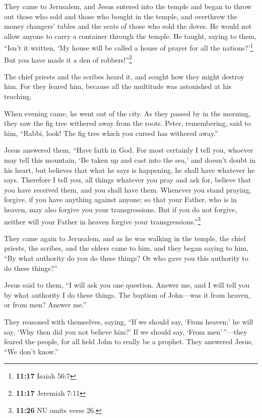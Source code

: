  They came to Jerusalem, and Jesus entered into the
temple and began to throw out those who sold and those who bought in the
temple, and overthrew the money changers' tables and the seats of those
who sold the doves.  He would not allow anyone to carry a
container through the temple.  He taught, saying to them,
``Isn't it written, `My house will be called a house of prayer for all
the nations?'\footnote{\textbf{11:17} Isaiah 56:7} But you have made it
a den of robbers!''\footnote{\textbf{11:17} Jeremiah 7:11}

 The chief priests and the scribes heard it, and sought
how they might destroy him. For they feared him, because all the
multitude was astonished at his teaching.

 When evening came, he went out of the city.
 As they passed by in the morning, they saw the fig tree
withered away from the roots.  Peter, remembering, said
to him, ``Rabbi, look! The fig tree which you cursed has withered
away.''

 Jesus answered them, ``Have faith in God.
 For most certainly I tell you, whoever may tell this
mountain, `Be taken up and cast into the sea,' and doesn't doubt in his
heart, but believes that what he says is happening, he shall have
whatever he says.  Therefore I tell you, all things
whatever you pray and ask for, believe that you have received them, and
you shall have them.  Whenever you stand praying,
forgive, if you have anything against anyone; so that your Father, who
is in heaven, may also forgive you your transgressions. 
But if you do not forgive, neither will your Father in heaven forgive
your transgressions.''\footnote{\textbf{11:26} NU omits verse 26.}

 They came again to Jerusalem, and as he was walking in
the temple, the chief priests, the scribes, and the elders came to him,
 and they began saying to him, ``By what authority do you
do these things? Or who gave you this authority to do these things?''

 Jesus said to them, ``I will ask you one question.
Answer me, and I will tell you by what authority I do these things.
 The baptism of John---was it from heaven, or from men?
Answer me.''

 They reasoned with themselves, saying, ``If we should
say, `From heaven;' he will say, `Why then did you not believe him?'
 If we should say, `From men'\,''---they feared the
people, for all held John to really be a prophet.  They
answered Jesus, ``We don't know.''

